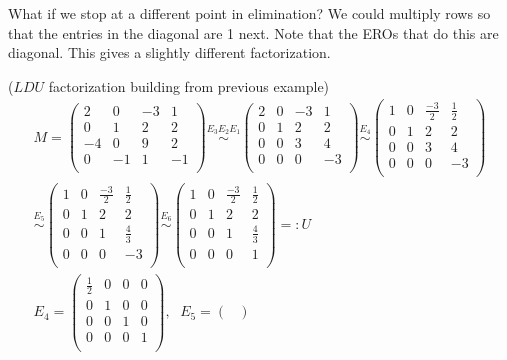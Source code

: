 \newpage
What if we stop at a different point in elimination? 
We could multiply rows so that the entries in the diagonal are 1 next. Note that the EROs that do this are diagonal. This gives a slightly different factorization.
\begin{example} ($LDU$ factorization building from previous example)
\begin{eqnarray*}
M=
\begin{pmatrix}
2&0&-3&1\\
0&1&2&2\\
-4&0&9&2\\
0&-1&1&-1\\
\end{pmatrix}
\stackrel{E_3E_2E_1}{\sim}
\begin{pmatrix}
2&0&-3&1\\
0&1&2&2\\
0&0&3&4\\
0&0&0&-3\\
\end{pmatrix}
\stackrel{E_4}{\sim}
\begin{pmatrix}
1&0&\frac{-3}{2}&\frac{1}{2}\\
0&1&2&2\\
0&0&3&4\\
0&0&0&-3\\
\end{pmatrix}
\\
\stackrel{E_5}{\sim}
\begin{pmatrix}
1&0&\frac{-3}{2}&\frac{1}{2}\\
0&1&2&2\\
0&0&1&\frac43\\
0&0&0&-3\\
\end{pmatrix}
\stackrel{E_6}{\sim}
\begin{pmatrix}
1&0&\frac{-3}{2}&\frac{1}{2}\\
0&1&2&2\\
0&0&1&\frac43\\
0&0&0&1\\
\end{pmatrix}
=:U
\\
E_4=
\begin{pmatrix}
\frac12&0&0&0\\
0&1&0&0\\
0&0&1&0\\
0&0&0&1\\
\end{pmatrix} , \, ~~
E_5=
\begin{pmatrix}

\end{pmatrix}
\end{eqnarray*}
\end{example}
